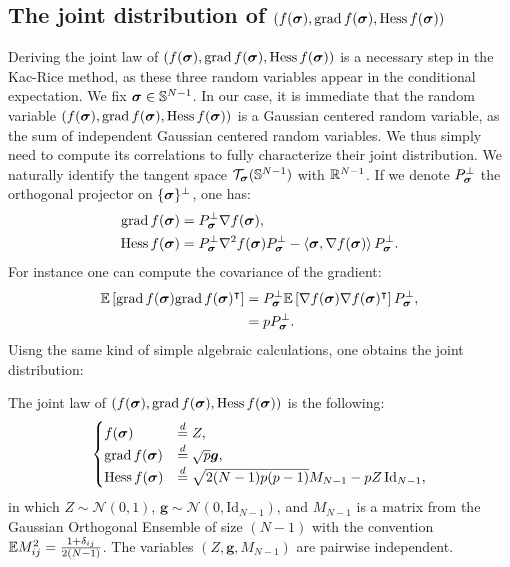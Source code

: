 \documentclass[amsmath,amssymb,nofootinbib,prd]{article}
\begin{document}
	\subsection{The joint distribution of \texorpdfstring{$(f({\boldsymbol{\sigma}}),\mathrm{grad}\, f({\boldsymbol{\sigma}}),\mathrm{Hess}\, f({\boldsymbol{\sigma}}))$}{(f,grad f, Hess f)}}
	
	Deriving the joint law of $(f({\boldsymbol{\sigma}}),\mathrm{grad}\, f({\boldsymbol{\sigma}}),\mathrm{Hess}\, f({\boldsymbol{\sigma}}))$ is a necessary step in the Kac-Rice method, as these three 
	random variables appear in the conditional expectation.
	We fix ${\boldsymbol{\sigma}}  \in \mathbb{S}^{N-1}$. 
	In our case, it is immediate that the random variable $(f({\boldsymbol{\sigma}}),\mathrm{grad}\, f({\boldsymbol{\sigma}}),\mathrm{Hess}\, f({\boldsymbol{\sigma}}))$ is a Gaussian centered random variable, as the sum of independent Gaussian centered random variables.
    We thus simply need to compute its correlations to fully characterize their joint distribution. We naturally identify the tangent space $\mathcal{T}_{\boldsymbol{\sigma}}(\mathbb{S}^{N-1})$ with $\mathbb{R}^{N-1}$. If we denote $P_{\boldsymbol{\sigma}}^\perp$ the orthogonal projector on $\{{\boldsymbol{\sigma}}\}^\perp$, one has:
	\begin{align}
	\mathrm{grad}\, f({\boldsymbol{\sigma}}) &= P_{\boldsymbol{\sigma}}^\perp \nabla f({\boldsymbol{\sigma}}), \\
	\mathrm{Hess}\, f({\boldsymbol{\sigma}}) &= P_{\boldsymbol{\sigma}}^\perp \nabla^2 f({\boldsymbol{\sigma}}) P_{{\boldsymbol{\sigma}}}^\perp - \braket{{\boldsymbol{\sigma}},\nabla f({\boldsymbol{\sigma}})} P_{\boldsymbol{\sigma}}^\perp.
	\end{align}
	For instance one can compute the covariance of the gradient:
	\begin{align*}
	\mathbb{E} \left[\mathrm{grad}\, f({\boldsymbol{\sigma}}) \mathrm{grad}\, f({\boldsymbol{\sigma}})^\intercal \right] &=  P_{\boldsymbol{\sigma}}^\perp\mathbb{E} \left[\nabla f({\boldsymbol{\sigma}}) \nabla f({\boldsymbol{\sigma}})^\intercal \right] P_{\boldsymbol{\sigma}}^\perp, \\
	&= p  P_{\boldsymbol{\sigma}}^\perp.
	\end{align*}
	Uisng the same kind of simple algebraic calculations, one obtains the joint distribution:
	\begin{lemma}\label{lemma:joint}
	The joint law of $(f({\boldsymbol{\sigma}}),\mathrm{grad}\, f({\boldsymbol{\sigma}}),\mathrm{Hess}\, f({\boldsymbol{\sigma}}))$ is the following:
	\begin{align}
	\begin{cases}
	f({\boldsymbol{\sigma}}) &\overset{d}{=} Z, \\
	\mathrm{grad}\, f({\boldsymbol{\sigma}}) &\overset{d}{=} \sqrt{p} \bm{g}, \\
	\mathrm{Hess}\, f({\boldsymbol{\sigma}}) &\overset{d}{=} \sqrt{2 (N-1)p(p-1)} M_{N-1} - p Z \, \mathrm{Id}_{N-1},
	\end{cases}
	\end{align}
	in which $Z \sim \mathcal{N}(0,1)$, $\bm{g} \sim \mathcal{N}(0,\mathrm{Id}_{N-1})$, and $M_{N-1}$ is a matrix from the Gaussian Orthogonal Ensemble of size $(N-1)$ with the convention $\mathbb{E} M_{ij}^2 = \frac{1+\delta_{ij}}{2(N-1)}$. The variables $(Z,\bm{g},M_{N-1})$ are pairwise independent.
	\end{lemma}
\end{document}
